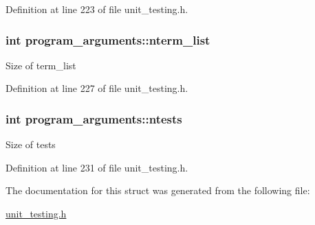 Definition at line 223 of file unit\-\_\-testing.\-h.

\hypertarget{structprogram__arguments_a48fbd16e4ce7ab5438078817c4931108}{
\subsubsection[{nterm\-\_\-list}]{\setlength{\rightskip}{0pt plus 5cm}int program\-\_\-arguments\-::nterm\-\_\-list}}\label{structprogram__arguments_a48fbd16e4ce7ab5438078817c4931108}
Size of {\ttfamily term\-\_\-list} 

Definition at line 227 of file unit\-\_\-testing.\-h.

\hypertarget{structprogram__arguments_a8b96bf14afced6bae0d45424ab2fac57}{
\subsubsection[{ntests}]{\setlength{\rightskip}{0pt plus 5cm}int program\-\_\-arguments\-::ntests}}\label{structprogram__arguments_a8b96bf14afced6bae0d45424ab2fac57}
Size of {\ttfamily tests} 

Definition at line 231 of file unit\-\_\-testing.\-h.



The documentation for this struct was generated from the following file\-:\begin{DoxyCompactItemize}
\item 
\hyperlink{unit__testing_8h}{unit\-\_\-testing.\-h}\end{DoxyCompactItemize}
